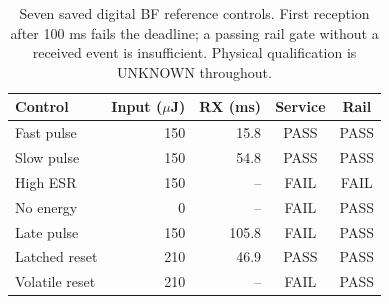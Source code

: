 \begin{table}[htbp]
\centering\small
\caption{Seven saved digital BF reference controls. First reception after 100 ms fails the deadline; a passing rail gate without a received event is insufficient. Physical qualification is UNKNOWN throughout.}
\label{tab:reference}
\begin{tabular}{@{}lrrcc@{}}\toprule
Control & Input ($\mu$J) & RX (ms) & Service & Rail \\\midrule
Fast pulse & 150 & 15.8 & PASS & PASS \\
Slow pulse & 150 & 54.8 & PASS & PASS \\
High ESR & 150 & -- & FAIL & FAIL \\
No energy & 0 & -- & FAIL & PASS \\
Late pulse & 150 & 105.8 & FAIL & PASS \\
Latched reset & 210 & 46.9 & PASS & PASS \\
Volatile reset & 210 & -- & FAIL & PASS \\
\bottomrule\end{tabular}
\end{table}
